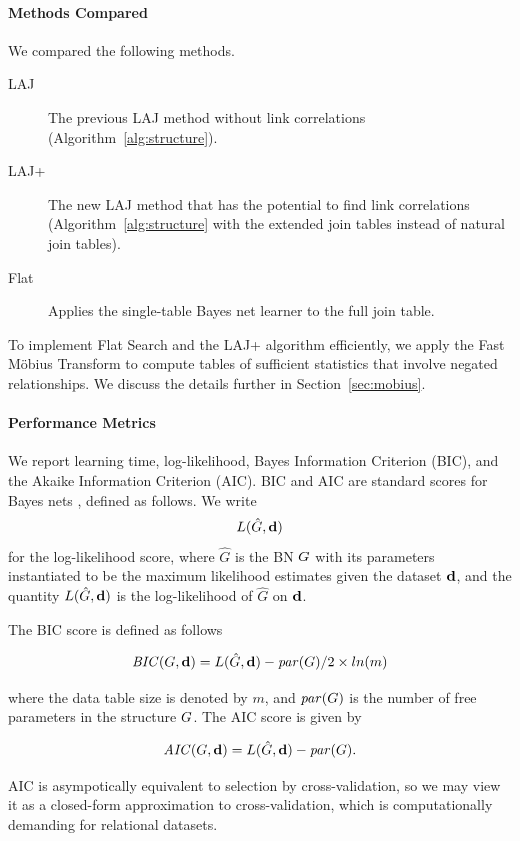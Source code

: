 \documentclass{article}
\begin{document}
\paragraph{Methods Compared}

We compared the following methods.

\begin{description}
\item[LAJ] The previous LAJ method without link correlations (Algorithm~\ref{alg:structure}).
\item[LAJ+] The new LAJ method that has the potential to find link correlations (Algorithm~\ref{alg:structure} with the extended join tables instead of natural join tables).
\item[Flat] Applies the single-table Bayes net learner to the full join table.
\end{description}

To implement Flat Search and the LAJ+ algorithm efficiently, we apply the Fast M\"obius Transform to compute tables of sufficient statistics that involve negated relationships. We discuss the details further in Section~\ref{sec:mobius}.

\paragraph{Performance Metrics} We report learning time, log-likelihood, Bayes Information Criterion (BIC), and the Akaike Information Criterion (AIC). BIC and AIC are standard scores for Bayes nets \cite{Chickering2003}, defined as follows. We write 
$$L(\hat{G},\mathbf{d})$$ for the log-likelihood score,
where $\hat{G}$ is the BN $G$ with its parameters instantiated to be the maximum likelihood estimates given the dataset $\mathbf{d}$, and the quantity $L(\hat{G},\mathbf{d})$ is the log-likelihood of $\hat{G}$ on $\mathbf{d}$. 

The BIC score is defined as follows \cite{Chickering2003,Schulte2011}

$$\mathit{BIC}(G,\mathbf{d}) = L(\hat{G},\mathbf{d}) - \mathit{par}(G)/2 \times ln(m)$$

where the data table size is denoted by $m$, and $\mathit{par}(G)$ is the number of free parameters in the structure $G$. The AIC score is given by 

$$\mathit{AIC}(G,\mathbf{d}) = L(\hat{G},\mathbf{d}) - \mathit{par}(G). $$

 AIC is asympotically equivalent to selection by cross-validation, so we may view it as a closed-form approximation to cross-validation,  which is computationally demanding for relational datasets. 
\end{document}
